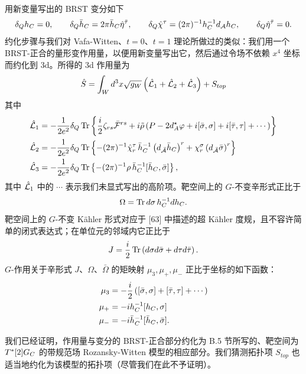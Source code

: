 用新变量写出的 BRST 变分如下
\[
    \delta_Qh_{C} = 0, \qquad
    \delta_Q\bar h_{C} = 2\pi\bar h_{C}\hat\eta^{\bar\tau}, \qquad
    \delta_Q\hat\chi^\tau = (2\pi)^{-1}h_{C}^{-1}d_{\mathcal{A}}h_{C}, \qquad
    \delta_Q\hat\eta^{\bar\tau} = 0 .
\]
约化步骤与我们对 Vafa-Witten、$t=0$、$t=1$ 理论所做过的类似：我们用一个 BRST-正合的量形变作用量，以便用新变量写出它，然后通过令场不依赖 $x^4$ 坐标而约化到 3d。所得的 3d 作用量为
\[
    \hat S = \int_Wd^3x\sqrt{g_W}\left(\hat{\mathcal{L}}_1+\hat{\mathcal{L}}_2+\hat{\mathcal{L}}_3\right) + S_{top}
\]
其中
\begin{align*}
    \hat{\mathcal{L}}_1 &= -\frac{1}{2e^2}\delta_Q\operatorname{Tr}\left\{\frac{i}{2}\zeta_{rs}\bar{\mathcal{F}}^{rs}
        + i\tilde\rho\left(P - 2d_A^\star\varphi + i[\bar\sigma,\sigma] + i[\bar\tau,\tau] + \cdots\right)\right\} \\
    \hat{\mathcal{L}}_2 &= -\frac{1}{2e^2}\delta_Q\operatorname{Tr}\left\{-(2\pi)^{-1}\hat\chi_r^\tau\,\bar h_{C}^{-1}
        \left(d_{\bar{\mathcal{A}}}\bar h_{C}\right)^r + \chi_r^\sigma\left(d_{\bar{\mathcal{A}}}\bar\sigma\right)^r\right\} \\
    \hat{\mathcal{L}}_3 &= -\frac{1}{2e^2}\delta_Q\operatorname{Tr}\left\{-(2\pi)^{-1}\rho\,\bar h_{C}^{-1}[\bar h_{C},\bar\sigma]\right\},
\end{align*}
其中 $\hat{\mathcal{L}}_1$ 中的 $\cdots$ 表示我们未显式写出的高阶项。靶空间上的 $G$-不变辛形式正比于
\[
    \Omega = \operatorname{Tr} d\sigma\, h_{C}^{-1}d h_{C} .
\]
靶空间上的 $G$-不变 Kähler 形式对应于 [63] 中描述的超 Kähler 度规，且不容许简单的闭式表达式；在单位元的邻域内它正比于
\[
    J = \frac{i}{2}\operatorname{Tr}\left(d\sigma d\bar\sigma + d\tau d\bar\tau\right) .
\]
$G$-作用关于辛形式 $J$、$\Omega$、$\bar\Omega$ 的矩映射 $\mu_3,\mu_+,\mu_-$ 正比于坐标的如下函数：
\begin{align*}
    \mu_3 &= -\frac{i}{2}\left([\bar\sigma,\sigma]+[\bar\tau,\tau]+\cdots\right) \\
    \mu_+ &= -i h_{C}^{-1}[h_{C},\sigma] \\
    \mu_- &= -i \bar h_{C}^{-1}[\bar h_{C},\bar\sigma] .
\end{align*}


我们已经证明，作用量与变分的 BRST-正合部分约化为 B.5 节所写的、靶空间为 $T^*[2]G_{C}$ 的带规范场 Rozansky-Witten 模型的相应部分。我们猜测拓扑项 $S_{top}$ 也适当地约化为该模型的拓扑项（尽管我们在此不予证明）。
